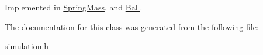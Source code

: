 Implemented in \hyperlink{classSpringMass_a187503b09da458570891a38612864e75}{Spring\+Mass}, and \hyperlink{classBall_a92dc65e1ed710ff01a4cbbb591ad7cb3}{Ball}.



The documentation for this class was generated from the following file\+:\begin{DoxyCompactItemize}
\item 
\hyperlink{simulation_8h}{simulation.\+h}\end{DoxyCompactItemize}
